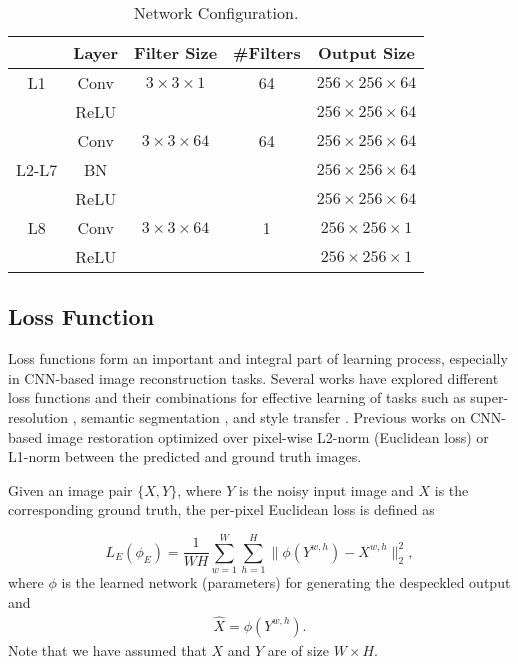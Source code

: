 \documentclass[journal]{IEEEtran}
\begin{document}
\begin{table}[htp!]
	\renewcommand{\arraystretch}{1.3}
	\caption{Network Configuration.}
	\label{tab:network-config}
	\centering
	\begin{tabular}{c|c|c|c|c}
		\hline
		\hline
		& Layer &   Filter Size & \#Filters&Output Size   \\
		\hline
 		L1&Conv &  $3\times 3 \times 1$ & 64&$256 \times 256 \times 64$   \\
 		&ReLU &   & &$256 \times 256 \times 64$   \\
		\hline
 		&Conv &   $3\times 3 \times 64$ & 64 & $256 \times 256 \times 64$  \\
		L2-L7&BN &    & &$256 \times 256 \times 64$  \\
		&ReLU &    & &$256 \times 256 \times 64$  \\
		\hline
 		L8&Conv &  $3\times 3 \times 64$ & 1&$256 \times 256 \times 1$   \\
 		&ReLU &     & &$256 \times 256 \times 1$   \\
		\hline
		\hline
	\end{tabular}
\end{table}





\subsection{Loss Function}
Loss functions form an important and integral part of learning process, especially in CNN-based image reconstruction tasks. Several works have explored different loss functions and their combinations for effective learning of tasks such as super-resolution \cite{cnnsuper}, semantic segmentation \cite{semantic_segmentation}, and style transfer \cite{style_transfer}. Previous works on CNN-based image restoration optimized over pixel-wise L2-norm (Euclidean loss) or L1-norm between the predicted and ground truth images.

Given an image pair $\{X, Y\}$, where $Y$ is the noisy input image and $X$ is the corresponding ground truth, the per-pixel Euclidean loss is defined as

\begin{equation}
L_E(\phi_E) = \frac{1}{WH}\sum_{w=1}^{W}\sum_{h=1}^{H}\|\phi(Y^{w,h})-X^{w,h}\|_2^2,
\end{equation}
where $\phi$ is the learned network (parameters) for generating the despeckled output and 
\begin{align}
\hat{X} = \phi(Y^{w,h}).
\end{align}
Note that we have assumed that $X$ and $Y$ are of size $W \times H$.
\end{document}
